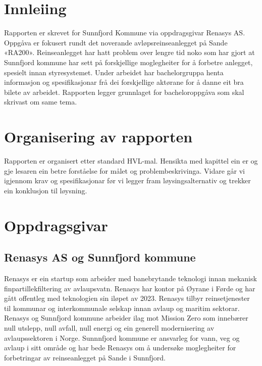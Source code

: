 \section{Innleiing}
\thispagestyle{fancy}
Rapporten er skrevet for Sunnfjord Kommune via oppdragsgivar Renasys AS.
Oppgåva er fokusert rundt det noverande avløpsreinseanlegget på Sande «RA200». Reinseanlegget har hatt 
problem over lengre tid noko som har gjort at Sunnfjord kommune har sett på forskjellige moglegheiter for å 
forbetre anlegget, spesielt innan styresystemet.
Under arbeidet har bachelorgruppa henta informasjon og spesifikasjonar frå dei forskjellige aktørane for å 
danne eit bra bilete av arbeidet. Rapporten legger grunnlaget for bacheloroppgåva som skal skrivast om same 
tema.

\newpage
\section{Organisering av rapporten}
Rapporten er organisert etter standard HVL-mal.
Hensikta med kapittel ein er og gje lesaren ein betre forståelse for målet og problembeskrivinga. 
Vidare går vi igjennom krav og spesifikasjonar før vi legger fram løysingsalternativ og trekker ein konklusjon til løysning.

\section{Oppdragsgivar}

\subsection{Renasys AS og Sunnfjord kommune}
Renasys er ein startup som arbeider med banebrytande teknologi innan mekanisk finpartillekfiltering av avlaupsvatn.
Renasys har kontor på Øyrane i Førde og har gått offentleg med teknologien sin iløpet av 2023. Renasys tilbyr reinsetjenester til kommunar og interkommunale selskap innan avlaup og maritim sektorar.
\newline
Renasys og Sunnfjord kommune arbeider ilag mot Mission Zero som innebærer null utslepp, null avfall, null energi og ein generell modernisering av avlaupssektoren i Norge.
Sunnnfjord kommune er ansvarleg for vann, veg og avlaup i sitt område og har bede Renasys om å undersøke moglegheiter for forbetringar av reinseanlegget på Sande i Sunnfjord.